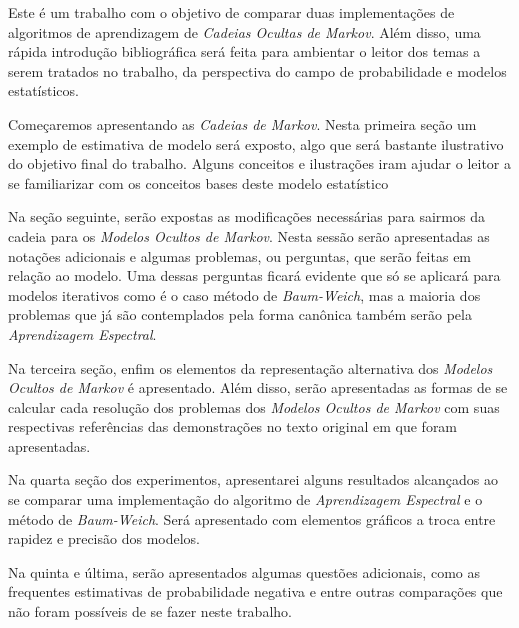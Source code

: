 \documentclass{subfiles}
\begin{document}
Este é um trabalho com o objetivo de comparar duas implementações de algoritmos de aprendizagem de \textit{Cadeias Ocultas de Markov}. Além disso, uma rápida introdução bibliográfica será feita para ambientar o leitor dos temas a serem tratados no trabalho, da perspectiva do campo de probabilidade e modelos estatísticos. 

Começaremos apresentando as \textit{Cadeias de Markov}. Nesta primeira seção um exemplo de estimativa de modelo será exposto, algo que será bastante ilustrativo do objetivo final do trabalho. Alguns conceitos e ilustrações iram ajudar o leitor a se familiarizar com os conceitos bases deste modelo estatístico

Na seção seguinte, serão expostas as modificações necessárias para sairmos da cadeia para os \textit{Modelos Ocultos de Markov}. Nesta sessão serão apresentadas as notações adicionais e algumas problemas, ou perguntas, que serão feitas em relação ao modelo. Uma dessas perguntas ficará evidente que só se aplicará para modelos iterativos como é o caso método de \textit{Baum-Weich}, mas a maioria dos problemas que já são contemplados pela forma canônica também serão pela \textit{Aprendizagem Espectral}.

Na terceira seção, enfim os elementos da representação alternativa dos \textit{Modelos Ocultos de Markov} é apresentado. Além disso, serão apresentadas as formas de se calcular cada resolução dos problemas dos \textit{Modelos Ocultos de Markov} com suas respectivas referências das demonstrações no texto original em que foram apresentadas.

Na quarta seção dos experimentos, apresentarei alguns resultados alcançados ao se comparar uma implementação do algoritmo de \textit{Aprendizagem Espectral} e o método de \textit{Baum-Weich}. Será apresentado com elementos gráficos a troca entre rapidez e precisão dos modelos.

Na quinta e última, serão apresentados algumas questões adicionais, como as frequentes estimativas de probabilidade negativa e entre outras comparações que não foram possíveis de se fazer neste trabalho.
\end{document}
